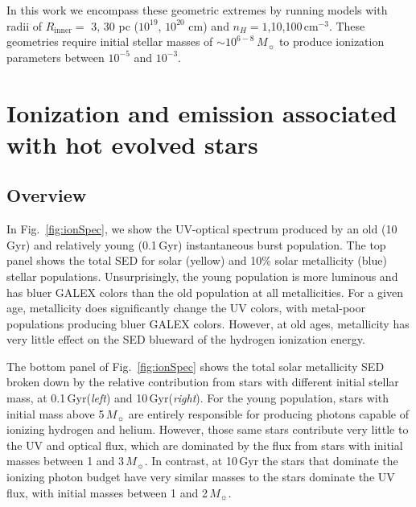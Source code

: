 \documentclass[preprint2]{aastex62}
\newcommand\Msun{\ensuremath{\,M_{\sun}}\xspace}
\newcommand{\Gyr}{$\,$Gyr\xspace}
\begin{document}
In this work we encompass these geometric extremes by running models with radii of $R_{\mathrm{inner}} =$ 3, 30 pc ($10^{19}$, $10^{20}$ cm) and $n_{H}=1$,10,100$\,$cm$^{-3}$. These geometries require initial stellar masses of ${\sim}10^{6-8}\Msun$ to produce ionization parameters between $10^{-5}$ and $10^{-3}$.


\section{Ionization and emission associated with hot evolved stars}\label{sec:stars}
\subsection{Overview}\label{sec:stars:overview}

In Fig.~\ref{fig:ionSpec}, we show the UV-optical spectrum produced by an old (10\Gyr) and relatively young (0.1\Gyr) instantaneous burst population. The top panel shows the total SED for solar (yellow) and 10\% solar metallicity (blue) stellar populations. Unsurprisingly, the young population is more luminous and has bluer GALEX colors than the old population at all metallicities. For a given age, metallicity does significantly change the UV colors, with metal-poor populations producing bluer GALEX colors. However, at old ages, metallicity has very little effect on the SED blueward of the hydrogen ionization energy.

The bottom panel of Fig.~\ref{fig:ionSpec} shows the total solar metallicity SED broken down by the relative contribution from stars with different initial stellar mass, at 0.1\Gyr (\emph{left}) and 10\Gyr (\emph{right}). For the young population, stars with initial mass above 5\Msun are entirely responsible for producing photons capable of ionizing hydrogen and helium. However, those same stars contribute very little to the UV and optical flux, which are dominated by the flux from stars with initial masses between 1 and 3\Msun. In contrast, at 10\Gyr the stars that dominate the ionizing photon budget have very similar masses to the stars dominate the UV flux, with initial masses between 1 and 2\Msun.
\end{document}
